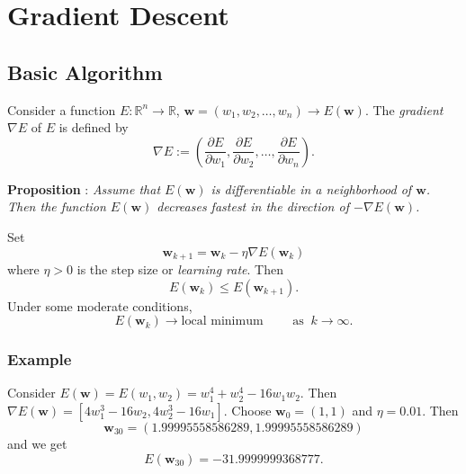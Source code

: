 \documentclass[
]{article}
\author{}
\date{}
\begin{document}
\newcommand{\Ber}{\operatorname{Ber}}
\newcommand{\E}{\operatorname{E}}
\newcommand{\V}{\operatorname{Var}}
\newcommand{\diag}{\operatorname{diag}}

\newcommand{\bi}{\mathbf{i}}
\newcommand{\bj}{\mathbf{j}}
\newcommand{\bt}{\mathbf{t}}

\newcommand{\bw}{{\boldsymbol{w}}}
\newcommand{\bv}{{\boldsymbol{v}}}
\newcommand{\bx}{{\boldsymbol{x}}}
\newcommand{\by}{{\boldsymbol{y}}}
\newcommand{\bb}{{\boldsymbol{b}}}
\newcommand{\bz}{{\boldsymbol{z}}}
\newcommand{\bu}{{\boldsymbol{u}}}
\newcommand{\bX}{{\boldsymbol{X}}}
\newcommand{\bY}{{\boldsymbol{Y}}}
\newcommand{\bZ}{{\boldsymbol{Z}}}

\hypertarget{gradient-descent}{%
\section{Gradient Descent}\label{gradient-descent}}

\hypertarget{basic-algorithm}{%
\subsection{Basic Algorithm}\label{basic-algorithm}}

Consider a function \(E: \mathbb R^n \rightarrow \mathbb R\),
\({\boldsymbol{w}}=(w_1, w_2, \dots , w_n) \rightarrow E({\boldsymbol{w}})\).
The \emph{gradient} \(\nabla E\) of \(E\) is defined by
\[  \nabla E := \left ( \frac {\partial E}{\partial w_1}, \frac {\partial E}{\partial w_2}, \dots , \frac {\partial E}{\partial w_n} \right ). \]

\textbf{Proposition }: \emph{Assume that \(E({\boldsymbol{w}})\) is
differentiable in a neighborhood of \({\boldsymbol{w}}\). Then the
function \(E({\boldsymbol{w}})\) decreases fastest in the direction of
\(-\nabla E ({\boldsymbol{w}})\).}

Set
\[ {\boldsymbol{w}}_{k+1}={\boldsymbol{w}}_k - \eta \nabla E({\boldsymbol{w}}_k) \]
where \(\eta >0\) is the step size or \emph{learning rate}. Then
\[ E({\boldsymbol{w}}_k) \le E({\boldsymbol{w}}_{k+1}).\] Under some
moderate conditions,
\[ E({\boldsymbol{w}}_k) \rightarrow \text{local minimum} \qquad \text{ as }\ k \rightarrow \infty .\]

\hypertarget{example}{%
\subsubsection{Example}\label{example}}

Consider \(E({\boldsymbol{w}})=E(w_1,w_2)= w_1^4+w_2^4-16w_1w_2\). Then
\(\nabla E({\boldsymbol{w}})= [ 4w_1^3-16w_2, 4w_2^3-16w_1]\). Choose
\({\boldsymbol{w}}_0=(1,1)\) and \(\eta =0.01\). Then
\[ {\boldsymbol{w}}_{30}=(1.99995558586289, 1.99995558586289)\] and we
get \[ E({\boldsymbol{w}}_{30})= -31.9999999368777. \]
\end{document}
